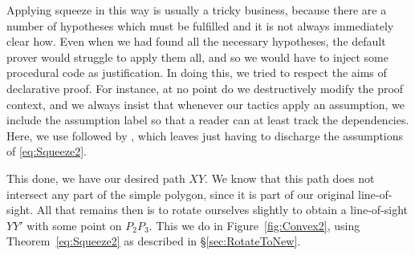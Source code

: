 
\label{sec:InjectingProcedural}Applying squeeze in this way is usually a tricky business, because there are a number of hypotheses which must be fulfilled and it is not always immediately clear how. Even when we had found all the necessary hypotheses, the default  prover would struggle to apply them all, and so we would have to inject some procedural code as justification. In doing this, we tried to respect the aims of declarative proof. For instance, at no point do we destructively modify the proof context, and we always insist that whenever our tactics apply an assumption, we include the assumption label so that a reader can at least track the dependencies. Here, we use  followed by , which leaves  just having to discharge the assumptions of \eqref{eq:Squeeze2}.



This done, we have our desired path $XY$. We know that this path does not intersect any part of the simple polygon, since it is part of our original line-of-sight. All that remains then is to rotate ourselves slightly to obtain a line-of-sight $YY'$ with some point on $P_2P_3$. This we do in Figure~\ref{fig:Convex2}, using Theorem~\ref{eq:Squeeze2} as described in \S\ref{sec:RotateToNew}. 

